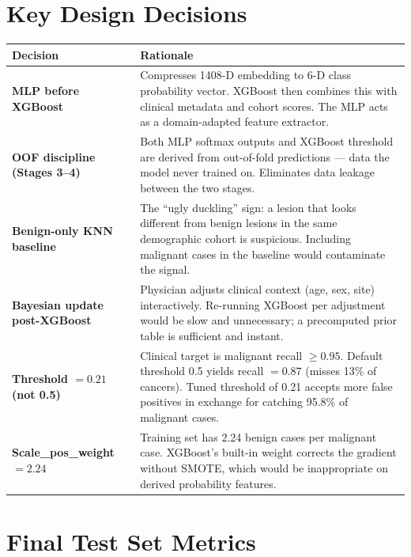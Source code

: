 \documentclass[12pt, a4paper]{article}
\begin{document}
\clearpage

\section{Key Design Decisions}

\begin{tabularx}{\linewidth}{@{} >{\bfseries\small}p{4cm} X @{}}
\toprule
Decision & Rationale \\
\midrule
MLP before XGBoost
  & Compresses 1408-D embedding to 6-D class probability vector.
    XGBoost then combines this with clinical metadata and cohort scores.
    The MLP acts as a domain-adapted feature extractor. \\
\addlinespace
OOF discipline (Stages 3--4)
  & Both MLP softmax outputs and XGBoost threshold are derived from
    out-of-fold predictions — data the model never trained on.
    Eliminates data leakage between the two stages. \\
\addlinespace
Benign-only KNN baseline
  & The ``ugly duckling'' sign: a lesion that looks different from
    benign lesions in the same demographic cohort is suspicious.
    Including malignant cases in the baseline would contaminate the signal. \\
\addlinespace
Bayesian update post-XGBoost
  & Physician adjusts clinical context (age, sex, site) interactively.
    Re-running XGBoost per adjustment would be slow and unnecessary;
    a precomputed prior table is sufficient and instant. \\
\addlinespace
Threshold $= 0.21$ (not 0.5)
  & Clinical target is malignant recall $\geq 0.95$.
    Default threshold 0.5 yields recall $= 0.87$ (misses 13\% of cancers).
    Tuned threshold of 0.21 accepts more false positives in exchange
    for catching 95.8\% of malignant cases. \\
\addlinespace
Scale\_pos\_weight $= 2.24$
  & Training set has 2.24 benign cases per malignant case.
    XGBoost's built-in weight corrects the gradient without SMOTE,
    which would be inappropriate on derived probability features. \\
\bottomrule
\end{tabularx}

\vspace{1.5em}

\section{Final Test Set Metrics}
\end{document}
